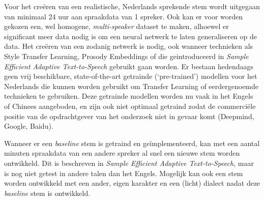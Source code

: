 Voor het creëren van een realistische, Nederlands sprekende stem wordt uitgegaan van minimaal 24 uur aan spraakdata van 1 spreker. Ook kan er voor worden gekozen een, wel homogene, \textit{multi-speaker} dataset te maken, alhoewel er significant meer data nodig is om een neural netwerk te laten generaliseren op de data. Het creëren van een zodanig netwerk is nodig, ook wanneer technieken als Style Transfer Learning, Prosody Embeddings of die geintroduceerd in \textit{Sample Efficient Adaptive Text-to-Speech} gebruikt gaan worden. Er bestaan hedendaags geen vrij beschikbare, state-of-the-art getrainde (`pre-trained') modellen voor het Nederlands die kunnen worden gebruikt om Transfer Learning of eerdergenoemde technieken te gebruiken. Deze getrainde modellen worden nu vaak in het Engels of Chinees aangeboden, en zijn ook niet optimaal getraind zodat de commerciële positie van de opdrachtgever van het onderzoek niet in gevaar komt (Deepmind, Google, Baidu).

Wanneer er een \textit{baseline} stem is getraind en geïmplementeerd, kan met een aantal minuten spraakdata van een andere spreker al snel een nieuwe stem worden ontwikkeld. Dit is beschreven in \textit{Sample Efficient Adaptive Text-to-Speech}, maar is nog niet getest in andere talen dan het Engels. Mogelijk kan ook een stem worden ontwikkeld met een ander, eigen karakter en een (licht) dialect nadat deze \textit{baseline} stem is ontwikkeld.

